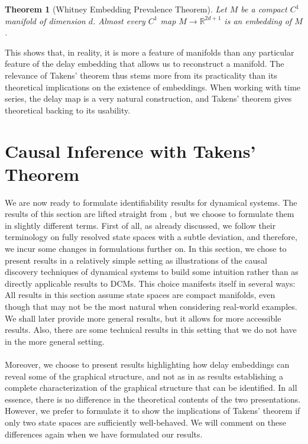 \documentclass[11pt, a4paper]{memoir}
\theoremstyle{break}
\newtheorem{thm}{Theorem}
\theoremstyle{break}
\theoremstyle{nonumberplain}
\newcommand{\mR}{\mathbb{R}}
\begin{document}
\begin{thm}[Whitney Embedding Prevalence Theorem]
Let $M$ be a compact $C^1$ manifold of dimension $d$. Almost every $C^1$ map $M\to \mR^{2d+1}$ is an embedding of $M$.
\end{thm}
This shows that, in reality, it is more a feature of manifolds than any particular feature of the delay embedding that allows us to reconstruct a manifold. The relevance of Takens' theorem thus stems more from its practicality than its theoretical implications on the existence of embeddings. When working with time series, the delay map is a very natural construction, and Takens' theorem gives theoretical backing to its usability. 

\section{Causal Inference with Takens' Theorem}
We are now ready to formulate identifiability results for dynamical systems. The results of this section are lifted straight from \cite{mathFound}, but we choose to formulate them in slightly different terms. First of all, as already discussed, we follow their terminology on fully resolved state spaces with a subtle deviation, and therefore, we incur some changes in formulations further on. In this section, we chose to present results in a relatively simple setting as illustrations of the causal discovery techniques of dynamical systems to build some intuition rather than as directly applicable results to DCMs. This choice manifests itself in several ways: All results in this section assume state spaces are compact manifolds, even though that may not be the most natural when considering real-world examples. We shall later provide more general results, but it allows for more accessible results. Also, there are some technical results in this setting that we do not have in the more general setting.\\\\
Moreover, we choose to present results highlighting how delay embeddings can reveal some of the graphical structure, and not as in \cite{mathFound} as results establishing a complete characterization of the graphical structure that can be identified. In all essence, there is no difference in the theoretical contents of the two presentations. However, we prefer to formulate it to show the implications of Takens' theorem if only two state spaces are sufficiently well-behaved. We will comment on these differences again when we have formulated our results.\\\\
\end{document}
